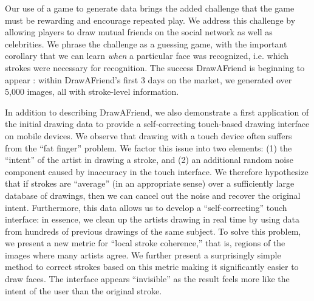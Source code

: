 Our use of a game to generate data brings the added challenge that
the game must be rewarding and encourage repeated play. We address
this challenge by allowing players to draw mutual friends on the
social network 
 as well as celebrities. We phrase the challenge as a
guessing game, with the important corollary that we can learn
\emph{when} a particular face was recognized, i.e. which strokes
were necessary for recognition. The success DrawAFriend is beginning
to appear : within DrawAFriend's first 3 days on the market,
we generated over 5,000 images, all with stroke-level information.

In addition to describing DrawAFriend, we also demonstrate a first
application of the initial drawing data to provide a self-correcting
touch-based drawing interface on mobile devices. We observe that
drawing with a touch device often suffers from the ``fat finger''
problem. We factor this issue into two elements: (1) the ``intent''
of the artist in drawing a stroke, and (2) an additional random
noise component caused by inaccuracy in the touch interface. We
therefore hypothesize that if strokes are ``average'' (in an
appropriate sense) over a sufficiently large database of drawings,
then we can cancel out the noise and recover the original intent.
Furthermore, this data allows us to develop a ``self-correcting''
touch interface: in essence, we clean up the artists drawing in real
time by using data from hundreds of previous drawings of the same
subject. To solve this problem, we present a new metric for ``local
stroke coherence,'' that is, regions of the images where many
artists agree. We further present a surprisingly simple method to
correct strokes based on this metric making it significantly easier
to draw faces. The interface appears ``invisible'' as the result
feels more like the intent of the user than the original stroke.




